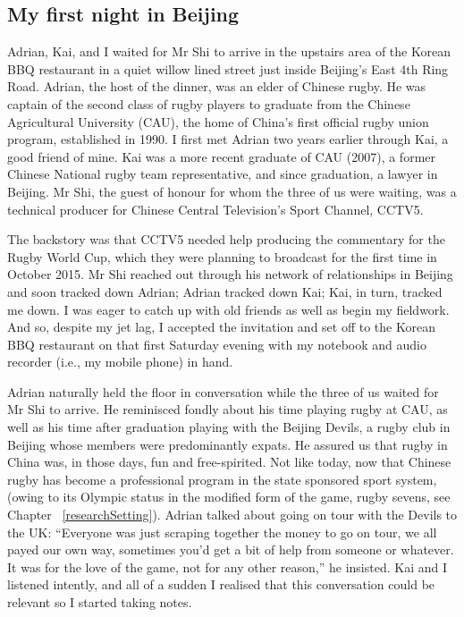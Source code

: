                                          \begin{CJK}{UTF8}{gbsn}

\section{My first night in Beijing \label{vig:adrian}}

Adrian, Kai, and I waited for Mr Shi to arrive in the upstairs area of the Korean BBQ restaurant in a quiet willow lined street just inside Beijing's East 4th Ring Road.  Adrian, the host of the dinner, was an elder of Chinese rugby.  He was captain of the second class of rugby players to graduate from the Chinese Agricultural University (CAU), the home of China's first official rugby union program, established in 1990.  I first met Adrian two years earlier through Kai, a good friend of mine.  Kai was a more recent graduate of CAU (2007), a former Chinese National rugby team representative, and since graduation, a lawyer in Beijing.  Mr Shi, the guest of honour for whom the three of us were waiting, was a technical producer for Chinese Central Television's Sport Channel, CCTV5.

The backstory was that CCTV5 needed help producing the commentary for the Rugby World Cup, which they were planning to broadcast for the first time in October 2015.  Mr Shi reached out through his network of relationships in Beijing and soon tracked down Adrian; Adrian tracked down Kai; Kai, in turn, tracked me down.  I was eager to catch up with old friends as well as begin my fieldwork. And so, despite my jet lag, I accepted the invitation and set off to the Korean BBQ restaurant on that first Saturday evening with my notebook and audio recorder (i.e., my mobile phone) in hand.

Adrian naturally held the floor in conversation while the three of us waited for Mr Shi to arrive.  He reminisced fondly about his time playing rugby at CAU, as well as his time after graduation playing with the Beijing Devils, a rugby club in Beijing whose members were predominantly expats.  He assured us that rugby in China was, in those days, fun and free-spirited.  Not like today, now that Chinese rugby has become a professional program in the state sponsored sport system, (owing to its Olympic status in the modified form of the game, rugby sevens, see Chapter ~\ref{researchSetting}).  Adrian talked about going on tour with the Devils to the UK:  ``Everyone was just scraping together the money to go on tour, we all payed our own way, sometimes you'd get a bit of help from someone or whatever. It was for the love of the game, not for any other reason,'' he insisted.  Kai and I listened intently, and all of a sudden I realised that this conversation could be relevant so I started taking notes.


\end{CJK}
